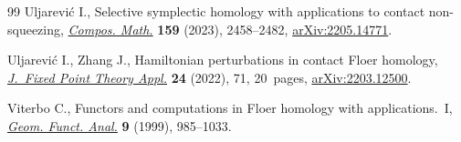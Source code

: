 \documentclass[pdftex]{sigma}
\numberwithin{equation}{section}
\theoremstyle{definition}
\begin{document}
\begin{thebibliography}{99}
Uljarevi\'c I., Selective symplectic homology with applications to contact
 non-squeezing,
 \href{https://doi.org/10.1112/s0010437x23007480}{\textit{Compos. Math.}}
 \textbf{159} (2023), 2458--2482,
 \href{http://arxiv.org/abs/2205.14771}{arXiv:2205.14771}.

Uljarevi\'c I., Zhang J., Hamiltonian perturbations in contact {F}loer
 homology, \href{https://doi.org/10.1007/s11784-022-00986-1}{\textit{J.~Fixed
 Point Theory Appl.}} \textbf{24} (2022), 71, 20~pages,
 \href{http://arxiv.org/abs/2203.12500}{arXiv:2203.12500}.

Viterbo C., Functors and computations in {F}loer homology with
 applications.~{I}, \href{https://doi.org/10.1007/s000390050106}{\textit{Geom.
 Funct. Anal.}} \textbf{9} (1999), 985--1033.

\end{thebibliography}\LastPageEnding
\end{document}
